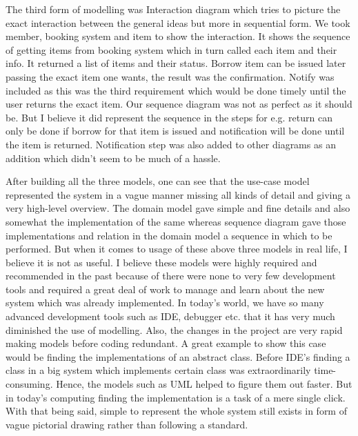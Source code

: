 The third form of modelling was Interaction diagram which tries to picture the exact interaction between the general ideas but more in sequential form. We took member, booking system and item to show the interaction. It shows the sequence of getting items from booking system which in turn called each item and their info. It returned a list of items and their status. Borrow item can be issued later passing the exact item one wants, the result was the confirmation. Notify was included as this was the third requirement which would be done timely until the user returns the exact item. Our sequence diagram was not as perfect as it should be. But I believe it did represent the sequence in the steps for e.g. return can only be done if borrow for that item is issued and notification will be done until the item is returned. Notification step was also added to other diagrams as an addition which didn't seem to be much of a hassle. 

After building all the three models, one can see that the use-case model represented the system in a vague manner missing all kinds of detail and giving a very high-level overview. The domain model gave simple and fine details and also somewhat the implementation of the same whereas sequence diagram gave those implementations and relation in the domain model a sequence in which to be performed. But when it comes to usage of these above three models in real life, I believe it is not as useful. I believe these models were highly required and recommended in the past because of there were none to very few development tools and required a great deal of work to manage and learn about the new system which was already implemented. In today's world, we have so many advanced development tools such as IDE, debugger etc. that it has very much diminished the use of modelling. Also, the changes in the project are very rapid making models before coding redundant. A great example to show this case would be finding the implementations of an abstract class. Before IDE's finding a class in a big system which implements certain class was extraordinarily time-consuming. Hence, the models such as UML helped to figure them out faster. But in today's computing finding the implementation is a task of a mere single click. With that being said, simple to represent the whole system still exists in form of vague pictorial drawing rather than following a standard.
